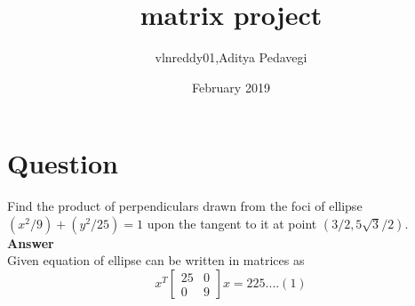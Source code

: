 \documentclass{article}
\title{matrix project}
\author{vlnreddy01,Aditya Pedavegi  }
\date{February 2019}
\begin{document}
\maketitle
\Large{}
\section{Question}

Find the product of perpendiculars drawn from the foci of ellipse $(x^2/9) + (y^2/25) = 1$ upon the tangent to it at point $(3/2 ,5\sqrt3/2) $.
\\

\textbf{Answer}\\
Given equation of ellipse can be written in matrices as
\begin{equation*}
x^T 
\begin{bmatrix}
25 & 0
\\
0 & 9
\end{bmatrix}
x = 225 ....(1)
\end{equation*}
\end{document}
